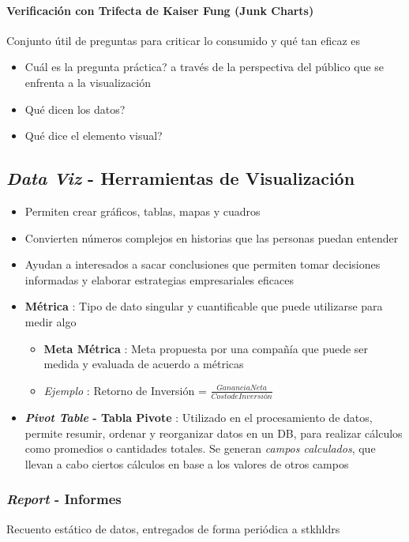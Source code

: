 \paragraph{Verificación con Trifecta de Kaiser Fung (Junk Charts)}
Conjunto útil de preguntas para criticar lo consumido y qué tan eficaz es
\begin{itemize}
    \item {Cuál es la pregunta práctica? a través de la perspectiva del público que se enfrenta a la visualización}
    \item {Qué dicen los datos?}
    \item {Qué dice el elemento visual?}
\end{itemize}

\subsection{\textit{Data Viz} - Herramientas de Visualización}
\begin{itemize}
    \item {Permiten crear gráficos, tablas, mapas y cuadros}
    \item {Convierten números complejos en historias que las personas puedan entender}
    \item {Ayudan a interesados a sacar conclusiones que permiten tomar decisiones informadas y elaborar estrategias empresariales eficaces}
    \item {\textbf{Métrica} : Tipo de dato singular y cuantificable que puede utilizarse para medir algo
    \begin{itemize}
        \item {\textbf{Meta Métrica} : Meta propuesta por una compañía que puede ser medida y evaluada de acuerdo a métricas}
        \item {\textit{Ejemplo} : Retorno de Inversión = $\frac{Ganancia Neta}{Costo de Inversión}$}
    \end{itemize}}
    \item {\textbf{\textit{Pivot Table} - Tabla Pivote} : Utilizado en el procesamiento de datos, permite resumir, ordenar y reorganizar datos en un DB, para realizar cálculos como promedios o cantidades totales. Se generan \textit{campos calculados}, que llevan a cabo ciertos cálculos en base a los valores de otros campos}
\end{itemize}

\subsubsection{\textit{Report} - Informes}
Recuento estático de datos, entregados de forma periódica a \Gls{stkhldrs}

